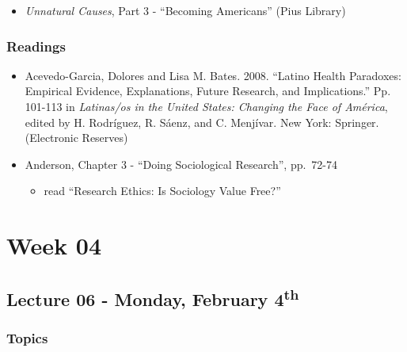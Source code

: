 \documentclass[]{book}
\providecommand{\tightlist}{%
  \setlength{\itemsep}{0pt}\setlength{\parskip}{0pt}}
\begin{document}
\begin{itemize}
\tightlist
\item
  \emph{Unnatural Causes}, Part 3 - ``Becoming Americans'' (Pius Library)
\end{itemize}

\hypertarget{readings-5}{%
\subsubsection*{Readings}\label{readings-5}}

\begin{itemize}
\tightlist
\item
  Acevedo-Garcia, Dolores and Lisa M. Bates. 2008. ``Latino Health Paradoxes: Empirical Evidence, Explanations, Future Research, and Implications.'' Pp. 101-113 in \emph{Latinas/os in the United States: Changing the Face of América}, edited by H. Rodríguez, R. Sáenz, and C. Menjívar. New York: Springer. (Electronic Reserves)
\item
  Anderson, Chapter 3 - ``Doing Sociological Research'', pp.~72-74

  \begin{itemize}
  \tightlist
  \item
    read ``Research Ethics: Is Sociology Value Free?''
  \end{itemize}
\end{itemize}

\hypertarget{week-04}{%
\section*{Week 04}\label{week-04}}

\hypertarget{lecture-06---monday-february-4th}{%
\subsection*{\texorpdfstring{Lecture 06 - Monday, February 4\textsuperscript{th}}{Lecture 06 - Monday, February 4th}}\label{lecture-06---monday-february-4th}}

\hypertarget{topics-6}{%
\subsubsection*{Topics}\label{topics-6}}
\end{document}

